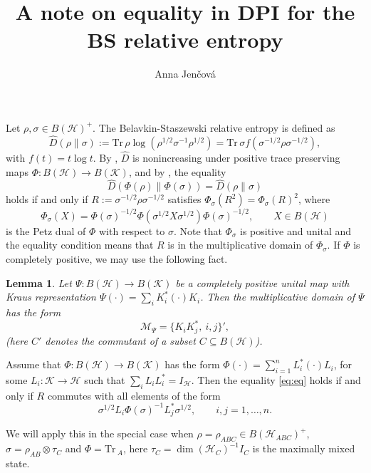 \documentclass[12pt]{article}
\title{A note on equality in DPI for the BS relative entropy}
\author{Anna Jen\v cov\'a}
\newtheorem{lemma}{Lemma}
\theoremstyle{definition}
\theoremstyle{remark}
\def\Me{\mathcal M}
\def\Ha{\mathcal H}
\def\Ka{\mathcal K}
\def \Tr{\mathrm{Tr}\,}
\begin{document}
\maketitle

Let $\rho, \sigma\in B(\Ha)^+$. The Belavkin-Staszewski relative entropy is defined as
\[
\hat D(\rho\|\sigma):=\Tr\rho\log(\rho^{1/2}\sigma^{-1}\rho^{1/2})=\Tr\sigma
f(\sigma^{-1/2}\rho\sigma^{-1/2}),
\]
with $f(t)=t\log t$. By \cite[Cor. 3.31]{hiai2017different}, $\hat D$ is nonincreasing
under positive trace preserving maps $\Phi:B(\Ha)\to B(\Ka)$, and by \cite[Thm. 3.34
(h)]{hiai2017different}, the equality
\begin{equation}\label{eq:eq}
\hat D(\Phi(\rho)\|\Phi(\sigma))=\hat D(\rho\|\sigma)
\end{equation}
holds if and only if $R:=\sigma^{-1/2}\rho\sigma^{-1/2}$ satisfies
$\Phi_\sigma(R^2)=\Phi_\sigma(R)^2$, where
\[
\Phi_\sigma(X)=\Phi(\sigma)^{-1/2}\Phi(\sigma^{1/2}X\sigma^{1/2})\Phi(\sigma)^{-1/2},\qquad
X\in B(\Ha)
\]
is the Petz dual of $\Phi$ with respect to $\sigma$. Note that $\Phi_\sigma$ is  positive
and unital and the equality condition means that $R$ is in the multiplicative domain of
$\Phi_\sigma$. If $\Phi$ is completely positive, we may use the following fact.

\begin{lemma}\label{lemma:multiplicative} Let $\Psi:B(\Ha)\to B(\Ka)$ be a completely positive unital map with Kraus
representation $\Psi(\cdot)=\sum_i K_i^* (\cdot) K_i$. Then the multiplicative domain of
$\Psi$ has the form
\[
\Me_\Psi=\{K_iK_j^*,\ i,j\}',
\]
(here $C'$ denotes the commutant of a subset $C\subseteq B(\Ha)$).
\end{lemma}

 Assume that $\Phi: B(\Ha)\to B(\Ka)$ has the form
$\Phi(\cdot)=\sum_{i=1}^n L_i^*(\cdot)L_i$, for some $L_i:\Ka\to \Ha$ such that
$\sum_iL_iL_i^*=I_\Ha$. Then the equality \eqref{eq:eq} holds if and only if $R$ commutes
with all elements of the form 
\[
\sigma^{1/2}L_i\Phi(\sigma)^{-1}L_j^*\sigma^{1/2},\qquad i,j=1,\dots,n.
\]

We will  apply this in the special case when $\rho=\rho_{ABC}\in B(\Ha_{ABC})^+$, $\sigma=\rho_{AB}\otimes
\tau_C$ and $\Phi=\Tr_A$, here $\tau_C=\dim(\Ha_C)^{-1}I_C$ is the maximally mixed state.
\end{document}
